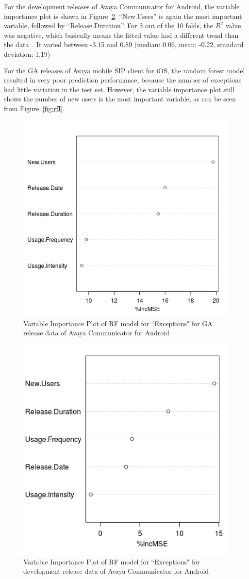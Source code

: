 \documentclass[smallextended]{svjour3}       %
\begin{document}
For the development releases of Avaya Communicator for Android, the variable importance plot is shown in Figure~\ref{fig:rfAD}. ``New.Users'' is again the most important variable, followed by ``Release.Duration''. 
For 3 out of the 10 folds, the $R^2$ value was negative, which basically means the fitted value had a different trend than the data~\cite{negRsq}. It varied between -3.15 and 0.89 (median: 0.06, mean: -0.22, standard deviation: 1.19)

For the GA releases of Avaya mobile SIP client for iOS, the random forest model resulted in very poor prediction performance, because the number of exceptions had little variation in the test set. However, the 
variable importance plot still shows the number of new users is the most important variable, as can be seen from Figure~\ref{fig:rfI}.

\begin{figure}[!t]
\centering
\includegraphics[width=0.5\linewidth]{rfAGA}%
\caption{Variable Importance Plot of RF model for ``Exceptions" for GA release data of Avaya Communicator for Android}
\label{fig:rfAGA}
\end{figure}

\begin{figure}[!t]
\centering
\includegraphics[width=0.5\linewidth]{rfAD}%
\caption{Variable Importance Plot of RF model for ``Exceptions" for development release data of Avaya Communicator for Android}
\label{fig:rfAD}
\end{figure}
\end{document}
